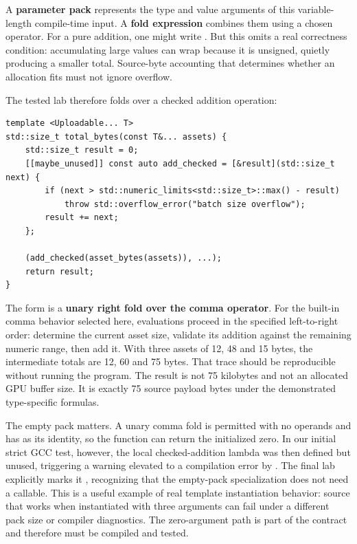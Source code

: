 A \textbf{parameter pack} represents the type and value arguments of this variable-length compile-time input. A \textbf{fold expression} combines them using a chosen operator. For a pure addition, one might write . But this omits a real correctness condition: accumulating large  values can wrap because it is unsigned, quietly producing a smaller total. Source-byte accounting that determines whether an allocation fits must not ignore overflow.

The tested lab therefore folds over a checked addition operation:

\begin{verbatim}
template <Uploadable... T>
std::size_t total_bytes(const T&... assets) {
    std::size_t result = 0;
    [[maybe_unused]] const auto add_checked = [&result](std::size_t next) {
        if (next > std::numeric_limits<std::size_t>::max() - result)
            throw std::overflow_error("batch size overflow");
        result += next;
    };

    (add_checked(asset_bytes(assets)), ...);
    return result;
}
\end{verbatim}

The  form is a \textbf{unary right fold over the comma operator}. For the built-in comma behavior selected here, evaluations proceed in the specified left-to-right order: determine the current asset size, validate its addition against the remaining numeric range, then add it. With three assets of 12, 48 and 15 bytes, the intermediate totals are 12, 60 and 75 bytes. That trace should be reproducible without running the program. The result is not 75 kilobytes and not an allocated GPU buffer size. It is exactly 75 source payload bytes under the demonstrated type-specific formulas.

The empty pack matters. A unary comma fold is permitted with no operands and has  as its identity, so the function can return the initialized zero. In our initial strict GCC test, however, the local checked-addition lambda was then defined but unused, triggering a warning elevated to a compilation error by . The final lab explicitly marks it , recognizing that the empty-pack specialization does not need a callable. This is a useful example of real template instantiation behavior: source that works when instantiated with three arguments can fail under a different pack size or compiler diagnostics. The zero-argument path is part of the contract and therefore must be compiled and tested.

